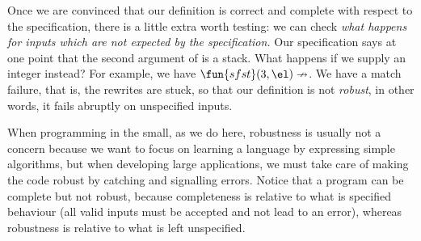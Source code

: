 Once we are convinced that our definition is correct
and complete with respect to the specification, there is a little
extra worth testing: we can check \emph{what happens for inputs which
  are not expected by the specification.} Our specification says at
one point that the second argument of  is a stack. What
happens if we supply an integer instead? For example, we have
\(\fun{sfst}(3,\el) \nrightarrow\). We have a match failure, that is,
the rewrites are stuck, so that our definition is not
\emph{robust}, in other words, it fails abruptly on
unspecified inputs.

When programming in the small, as we do here, robustness is usually
not a concern because we want to focus on learning a language by
expressing simple algorithms, but when developing large applications,
we must take care of making the code robust by catching and signalling
errors. Notice that a program can be complete but
not robust, because completeness is relative to
what is specified behaviour (all valid inputs must be accepted and not
lead to an error), whereas robustness is relative to what is left
unspecified.

